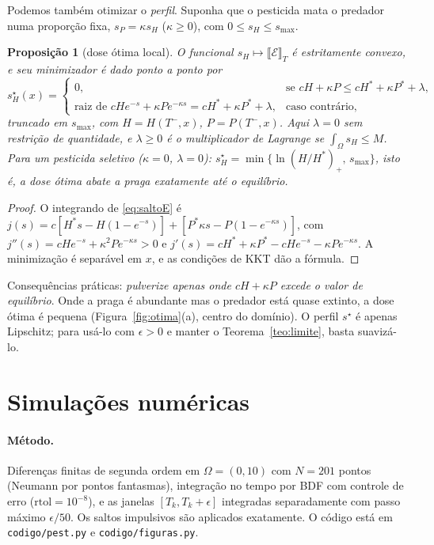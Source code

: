 \documentclass[11pt,a4paper]{article}
\numberwithin{equation}{section}
\newtheorem{proposicao}[teorema]{Proposição}
\theoremstyle{definition}
\theoremstyle{remark}
\newcommand{\E}{\mathcal{E}}
\newcommand{\jump}[1]{\llbracket #1 \rrbracket}
\newcommand{\Hs}{H^{*}}
\newcommand{\Ps}{P^{*}}
\begin{document}
Podemos também otimizar o \emph{perfil}. Suponha que o pesticida mata o predador numa proporção
fixa, $s_P=\kappa s_H$ ($\kappa\ge0$), com $0\le s_H\le s_{\max}$.

\begin{proposicao}[dose ótima local]\label{prop:otima}
O funcional $s_H\mapsto\jump{\E}_T$ é estritamente convexo, e seu minimizador é dado ponto a
ponto por
\[
s_H^\star(x)=
\begin{cases}
0, & \text{se } cH+\kappa P\le c\Hs+\kappa\Ps+\lambda,\\
\text{raiz de } cHe^{-s}+\kappa Pe^{-\kappa s}=c\Hs+\kappa\Ps+\lambda, & \text{caso contrário},
\end{cases}
\]
truncado em $s_{\max}$, com $H=H(T^-,x)$, $P=P(T^-,x)$. Aqui $\lambda=0$ sem restrição de
quantidade, e $\lambda\ge0$ é o multiplicador de Lagrange se $\int_\Omega s_H\le M$. Para um
pesticida seletivo ($\kappa=0$, $\lambda=0$): $s_H^\star=\min\{\ln(H/\Hs)_+,\,s_{\max}\}$, isto é,
a dose ótima abate a praga exatamente até o equilíbrio.
\end{proposicao}

\begin{proof}
O integrando de \eqref{eq:saltoE} é $j(s)=c[\Hs s-H(1-e^{-s})]+[\Ps\kappa s-P(1-e^{-\kappa s})]$,
com $j''(s)=cHe^{-s}+\kappa^2Pe^{-\kappa s}>0$ e
$j'(s)=c\Hs+\kappa\Ps-cHe^{-s}-\kappa Pe^{-\kappa s}$. A minimização é separável em $x$, e as
condições de KKT dão a fórmula.
\end{proof}

Consequências práticas: \emph{pulverize apenas onde $cH+\kappa P$ excede o valor de equilíbrio}.
Onde a praga é abundante mas o predador está quase extinto, a dose ótima é pequena
(Figura~\ref{fig:otima}(a), centro do domínio). O perfil $s^\star$ é apenas Lipschitz; para
usá-lo com $\epsilon>0$ e manter o Teorema~\ref{teo:limite}, basta suavizá-lo.

\section{Simulações numéricas}

\paragraph{Método.} Diferenças finitas de segunda ordem em $\Omega=(0,10)$ com $N=201$ pontos
(Neumann por pontos fantasmas), integração no tempo por BDF com controle de erro
($\mathrm{rtol}=10^{-8}$), e as janelas $[T_k,T_k+\epsilon]$ integradas separadamente com passo
máximo $\epsilon/50$. Os saltos impulsivos são aplicados exatamente. O código está em
\texttt{codigo/pest.py} e \texttt{codigo/figuras.py}.
\end{document}
